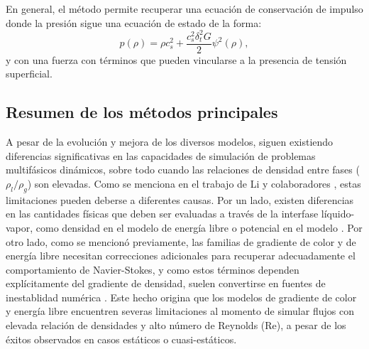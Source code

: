 En general, el m\'etodo \pp{} permite recuperar una ecuaci\'on de conservaci\'on de impulso donde la presi\'on sigue una ecuaci\'on de estado de la forma:
\begin{equation}
	p(\rho) = \rho c_s^2 + \dfrac{c_s^2 \delta_t^2 G}{2} \psi^2 (\rho),
\end{equation}
y con una fuerza con t\'erminos que pueden vincularse a la presencia de tensi\'on superficial.

\subsection{Resumen de los m\'etodos principales}

A pesar de la evoluci\'on y mejora de los diversos modelos, siguen existiendo diferencias significativas en las capacidades de simulaci\'on de problemas multif\'asicos din\'amicos, sobre todo cuando las relaciones de densidad entre fases ($\rho_l/\rho_g$) son elevadas. Como se menciona en el trabajo de Li y colaboradores \cite{li_lattice_2016}, estas limitaciones pueden deberse a diferentes causas. Por un lado, existen diferencias en las cantidades f\'isicas que deben ser evaluadas a trav\'es de la interfase l\'iquido-vapor, como densidad en el modelo de energ\'ia libre o potencial en el modelo \pp{}. Por otro lado, como se mencion\'o previamente, las familias de gradiente de color y de energ\'ia libre necesitan correcciones adicionales para recuperar adecuadamente el comportamiento de Navier-Stokes, y como estos t\'erminos dependen expl\'icitamente del gradiente de densidad, suelen convertirse en fuentes de inestablidad num\'erica \cite{leclaire_unsteady_2014,leclaire_enhanced_2013,huang_simulations_2013}. Este hecho origina que los modelos de gradiente de color y energ\'ia libre encuentren severas limitaciones al momento de simular flujos con elevada relaci\'on de densidades y alto n\'umero de Reynolds (Re), a pesar de los \'exitos observados en casos est\'aticos o cuasi-est\'aticos.

